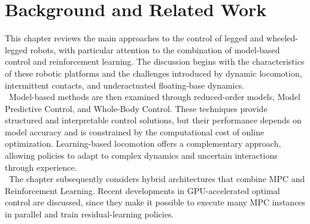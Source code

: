 \chapter{Background and Related Work}
This chapter reviews the main approaches to the control of legged and
wheeled-legged robots, with particular attention to the combination of
model-based control and reinforcement learning. The discussion begins with the
characteristics of these robotic platforms and the challenges introduced by
dynamic locomotion, intermittent contacts, and underactuated floating-base
dynamics.\\
\
Model-based methods are then examined through reduced-order models, Model
Predictive Control, and Whole-Body Control. These techniques provide structured
and interpretable control solutions, but their performance depends on model
accuracy and is constrained by the computational cost of online optimization.
Learning-based locomotion offers a complementary approach, allowing policies to
adapt to complex dynamics and uncertain interactions through experience.\\
\
The chapter subsequently considers hybrid architectures that combine MPC and
Reinforcement Learning. Recent developments in
GPU-accelerated optimal control are discussed, since they make it possible to
execute many MPC instances in parallel and train residual-learning
policies.



\newpage


\newpage


\newpage


\newpage




